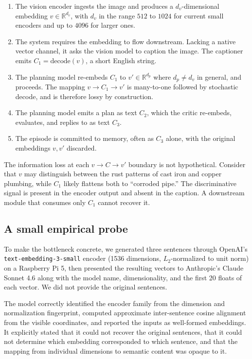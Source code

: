 \documentclass[11pt]{article}
\begin{document}
\begin{enumerate}
  \item The vision encoder ingests the image and produces a
        $d_v$-dimensional embedding $v \in \mathbb{R}^{d_v}$,
        with $d_v$ in the range $512$ to $1024$ for current
        small encoders and up to $4096$ for larger ones.
  \item The system requires the embedding to flow downstream.
        Lacking a native vector channel, it asks the vision
        model to caption the image. The captioner emits
        $C_1 = \mathrm{decode}(v)$, a short English string.
  \item The planning model re-embeds $C_1$ to $v' \in
        \mathbb{R}^{d_p}$ where $d_p \neq d_v$ in general, and
        proceeds. The mapping $v \to C_1 \to v'$ is many-to-one
        followed by stochastic decode, and is therefore lossy by
        construction.
  \item The planning model emits a plan as text $C_2$, which the
        critic re-embeds, evaluates, and replies to as text $C_3$.
  \item The episode is committed to memory, often as $C_3$ alone,
        with the original embeddings $v, v'$ discarded.
\end{enumerate}

The information loss at each $v \to C \to v'$ boundary is not
hypothetical. Consider that $v$ may distinguish between the rust
patterns of cast iron and copper plumbing, while $C_1$ likely
flattens both to ``corroded pipe.'' The discriminative signal is
present in the encoder output and absent in the caption. A
downstream module that consumes only $C_1$ cannot recover it.

\subsection{A small empirical probe}

To make the bottleneck concrete, we generated three sentences
through OpenAI's \texttt{text-embedding-3-small} encoder
(1536 dimensions, $L_2$-normalized to unit norm) on a Raspberry
Pi 5, then presented the resulting vectors to Anthropic's Claude
Sonnet 4.6 along with the model name, dimensionality, and the
first 20 floats of each vector. We did not provide the original
sentences.

The model correctly identified the encoder family from the
dimension and normalization fingerprint, computed approximate
inter-sentence cosine alignment from the visible coordinates,
and reported the inputs as well-formed embeddings. It explicitly
stated that it could not recover the original sentences, that it
could not determine which embedding corresponded to which
sentence, and that the mapping from individual dimensions to
semantic content was opaque to it.
\end{document}

